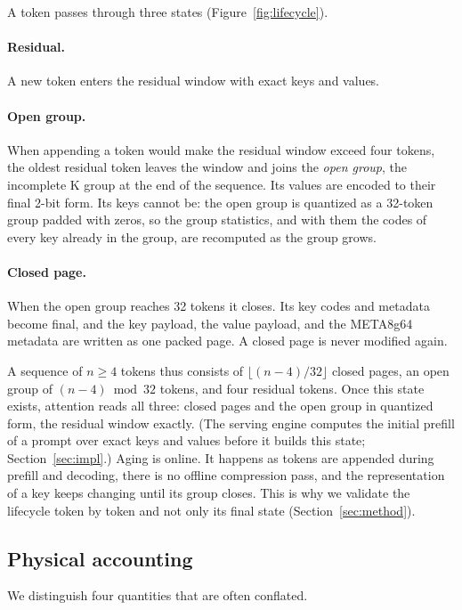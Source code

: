 \documentclass{article}
\begin{document}
A token passes through three states (Figure~\ref{fig:lifecycle}).

\paragraph{Residual.}
A new token enters the residual window with exact keys and values.

\paragraph{Open group.}
When appending a token would make the residual window exceed four tokens, the oldest residual token
leaves the window and joins the \emph{open group}, the
incomplete K group at the end of the sequence. Its values are encoded to their final 2-bit form. Its
keys cannot be: the open group is quantized as a 32-token group padded with zeros, so the group
statistics, and with them the codes of every key already in the group, are recomputed as the group
grows.

\paragraph{Closed page.}
When the open group reaches 32 tokens it closes. Its key codes and metadata become final, and the key
payload, the value payload, and the META8g64 metadata are written as one packed page. A closed page is
never modified again.

A sequence of $n \ge 4$ tokens thus consists of $\lfloor (n-4)/32 \rfloor$ closed pages, an open group
of $(n-4) \bmod 32$ tokens, and four residual tokens. Once this state exists, attention reads all
three: closed pages and the open group in quantized form, the residual window exactly. (The serving
engine computes the initial prefill of a prompt over exact keys and values before it builds this
state; Section~\ref{sec:impl}.) Aging is online. It happens as tokens are
appended during prefill and decoding, there is no offline compression pass, and the representation of a
key keeps changing until its group closes. This is why we validate the lifecycle token by token and not only
its final state (Section~\ref{sec:method}).

\subsection{Physical accounting}

We distinguish four quantities that are often conflated.
\end{document}
